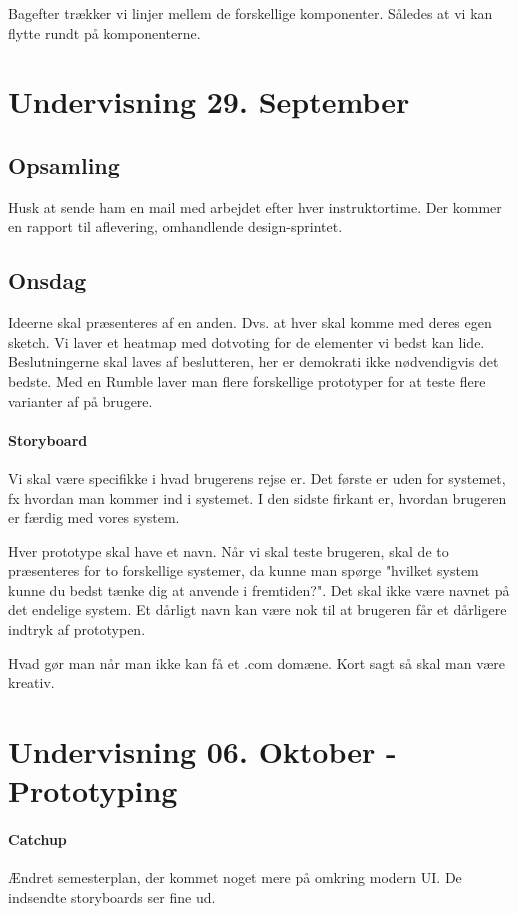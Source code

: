 \documentclass{article}
\begin{document}
Bagefter trækker vi linjer mellem de forskellige komponenter. Således at vi kan
flytte rundt på komponenterne.

\newpage
\section{Undervisning 29. September}
\subsection{Opsamling}
Husk at sende ham en mail med arbejdet efter hver instruktortime. Der kommer en
rapport til aflevering, omhandlende design-sprintet.

\subsection{Onsdag}

Ideerne skal præsenteres af en anden. Dvs. at hver skal komme med deres egen
sketch. Vi laver et heatmap med dotvoting for de elementer vi bedst kan lide.
Beslutningerne skal laves af beslutteren, her er demokrati ikke nødvendigvis det
bedste.
Med en Rumble laver man flere forskellige prototyper for at teste flere
varianter af på brugere.

\paragraph{Storyboard} 
Vi skal være specifikke i hvad brugerens rejse er. Det første er uden for
systemet, fx hvordan man kommer ind i systemet. I den sidste firkant er, hvordan
brugeren er færdig med vores system.

Hver prototype skal have et navn. Når vi skal teste brugeren, skal de to
præsenteres for to forskellige systemer, da kunne man spørge "hvilket system
kunne du bedst tænke dig at anvende i fremtiden?". Det skal ikke være navnet på
det endelige system. Et dårligt navn kan være nok
til at brugeren får et dårligere indtryk af prototypen.

Hvad gør man når man ikke kan få et .com domæne. Kort sagt så skal man være
kreativ.

\newpage

\section{Undervisning 06. Oktober - Prototyping}

\paragraph{Catchup}
Ændret semesterplan, der kommet noget mere på omkring modern UI. De indsendte
storyboards ser fine ud.
\end{document}
